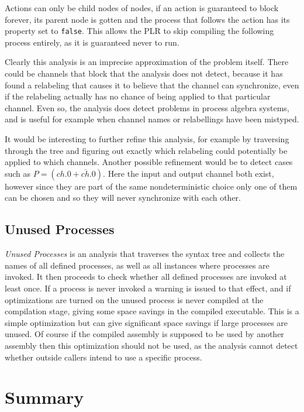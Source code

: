 	Actions can only be child nodes of  nodes, if an 
	action is guaranteed to block forever, its parent 
	node is gotten and the process that follows the action has its 
	 property set to \texttt{false}. This allows the PLR to skip
	compiling the following process entirely, as it is guaranteed never to run.
	 
	Clearly this analysis is an imprecise approximation of the problem itself. 
	There could be channels that block that the analysis does not detect, because
	it has found a relabeling that causes it to believe that the channel can 
	synchronize, even if the relabeling actually has no chance of being applied
	to that particular channel. Even so, the analysis does detect problems in
	process algebra systems, and is useful for example when channel names or
	relabellings have been mistyped.
	
	It would be interesting to further refine this analysis, for example by 
	traversing through the tree and figuring out exactly which relabeling
	could potentially be applied to which channels. Another possible refinement
	would be to detect cases such as $P = (ch.0+\overline{ch}.0)$. Here the
	input and output channel both exist, however since they are part of the
	same nondeterministic choice only one of them can be chosen and so they
	will never synchronize with each other.

\subsection{Unused Processes}

	\textit{Unused Processes} is an analysis that traverses the syntax tree and
	collects the names of all defined processes, as well as all instances where
	processes are invoked. It then proceeds to check whether all defined 
	processes are invoked at least once. If a process is never invoked a warning 
	is issued to that effect, and if optimizations are turned on the unused 
	process is never compiled at the compilation stage, giving some space 
	savings in the compiled executable. This is a simple optimization but can 
	give significant space savings if large processes are unused. Of course if 
	the compiled assembly is supposed to be used by another assembly then this 
	optimization should not be used, as the analysis cannot detect whether 
	outside callers intend to use a specific process.
	
\section{Summary}

